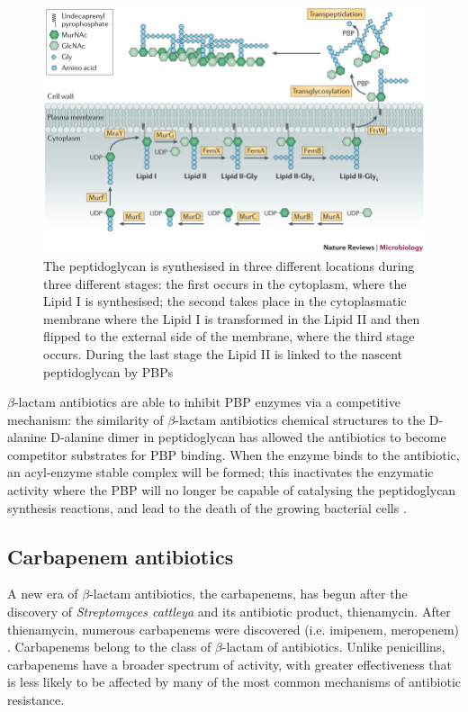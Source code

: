 \documentclass[11pt]{report}
\begin{document}
\clearpage
\begin{figure}[htp]
\centering
\includegraphics[scale=0.50]{img/Peptidoglycan.jpg}
\caption{The peptidoglycan is synthesised in three different locations during three different stages: the first occurs in the cytoplasm, where the Lipid I is synthesised; the second takes place in the cytoplasmatic membrane where the Lipid I is transformed in the Lipid II and then flipped to the external side of the membrane, where the third stage occurs. During the last stage the Lipid II is linked to the nascent peptidoglycan by PBPs \cite{Pinho2013}}
\label{}
\end{figure}


$\beta$-lactam antibiotics are able to inhibit PBP enzymes via a competitive mechanism: the similarity of $\beta$-lactam antibiotics chemical structures to the D-alanine D-alanine dimer in peptidoglycan has allowed the antibiotics to become competitor substrates for PBP binding.
When the enzyme binds to the antibiotic, an acyl-enzyme stable complex will be formed; this inactivates the enzymatic activity where the PBP will no longer be capable of catalysing the peptidoglycan synthesis reactions, and lead to the death of the growing bacterial cells \cite{kong2010beta}.

\subsection{Carbapenem antibiotics}
A new era of $\beta$-lactam antibiotics, the carbapenems, has begun after the discovery of \emph{Streptomyces cattleya} and its antibiotic product, thienamycin.
After thienamycin, numerous carbapenems were discovered (i.e. imipenem, meropenem) \cite{Birnbaum1985}.
Carbapenems belong to the class of $\beta$-lactam of antibiotics. 
Unlike penicillins, carbapenems have a broader spectrum of activity, with greater effectiveness that is less likely to be affected by many of the most common mechanisms of antibiotic resistance.
\end{document}
